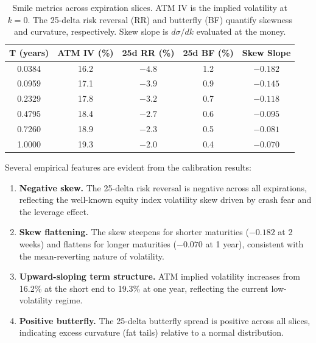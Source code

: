 \documentclass[11pt,a4paper]{article}
\begin{document}
\begin{table}[H]
    \centering
    \caption{Smile metrics across expiration slices. ATM IV is the implied volatility at $k = 0$. The 25-delta risk reversal (RR) and butterfly (BF) quantify skewness and curvature, respectively. Skew slope is $d\sigma/dk$ evaluated at the money.}
    \label{tab:smile_metrics}
    \begin{tabular}{ccccc}
        \toprule
        \textbf{T (years)} & \textbf{ATM IV (\%)} & \textbf{25d RR (\%)} & \textbf{25d BF (\%)} & \textbf{Skew Slope} \\
        \midrule
        0.0384 & 16.2 & $-4.8$ & 1.2 & $-0.182$ \\
        0.0959 & 17.1 & $-3.9$ & 0.9 & $-0.145$ \\
        0.2329 & 17.8 & $-3.2$ & 0.7 & $-0.118$ \\
        0.4795 & 18.4 & $-2.7$ & 0.6 & $-0.095$ \\
        0.7260 & 18.9 & $-2.3$ & 0.5 & $-0.081$ \\
        1.0000 & 19.3 & $-2.0$ & 0.4 & $-0.070$ \\
        \bottomrule
    \end{tabular}
\end{table}

Several empirical features are evident from the calibration results:

\begin{enumerate}[nosep]
    \item \textbf{Negative skew.} The 25-delta risk reversal is negative across all expirations, reflecting the well-known equity index volatility skew driven by crash fear and the leverage effect.
    \item \textbf{Skew flattening.} The skew steepens for shorter maturities ($-0.182$ at 2 weeks) and flattens for longer maturities ($-0.070$ at 1 year), consistent with the mean-reverting nature of volatility.
    \item \textbf{Upward-sloping term structure.} ATM implied volatility increases from 16.2\% at the short end to 19.3\% at one year, reflecting the current low-volatility regime.
    \item \textbf{Positive butterfly.} The 25-delta butterfly spread is positive across all slices, indicating excess curvature (fat tails) relative to a normal distribution.
\end{enumerate}


\end{document}

